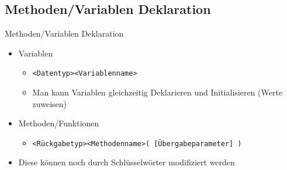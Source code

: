 \subsection{Methoden/Variablen Deklaration}
\begin{frame}{Methoden/Variablen Deklaration}
	\begin{itemize}
		\item Variablen
		
		\begin{itemize}
			\item \alert{\texttt{<Datentyp><Variablenname>}}
			\item Man kann Variablen gleichzeitig Deklarieren und Initialisieren (Werte zuweisen)
		\end{itemize}
		\item Methoden/Funktionen		
		
		\begin{itemize}			
			\item \alert{\texttt{<Rückgabetyp><Methodenname>( [Übergabeparameter] )}}
		\end{itemize}
		\item Diese können noch durch Schlüsselwörter modifiziert werden
	\end{itemize}
\end{frame}


